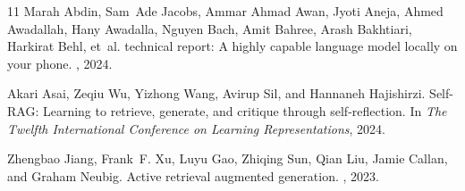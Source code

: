 \documentclass[11pt]{article}
\begin{document}
\begin{thebibliography}{11}
Marah Abdin, Sam~Ade Jacobs, Ammar Ahmad Awan, Jyoti Aneja, Ahmed Awadallah, Hany Awadalla,
Nguyen Bach, Amit Bahree, Arash Bakhtiari, Harkirat Behl, et~al.
 technical report: A highly capable language model locally on your phone.
, 2024.

Akari Asai, Zeqiu Wu, Yizhong Wang, Avirup Sil, and Hannaneh Hajishirzi.
\newblock Self-{RAG}: Learning to retrieve, generate, and critique through self-reflection.
\newblock In {\em The Twelfth International Conference on Learning Representations}, 2024.

Zhengbao Jiang, Frank~F. Xu, Luyu Gao, Zhiqing Sun, Qian Liu, Jamie Callan, and Graham Neubig.
\newblock Active retrieval augmented generation.
, 2023.

\end{thebibliography}
\end{document}
